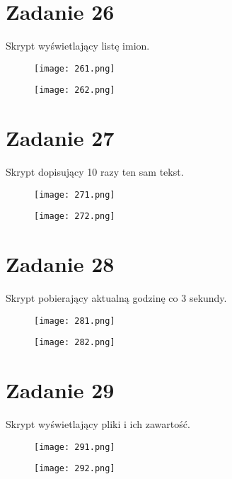 \documentclass[fleqn,onecolumn,a4paper,12pt,titlepage]{article}
\begin{document}
\section*{Zadanie 26}
Skrypt wyświetlający listę imion.
\begin{figure}[H]%
    \centering\texttt{[image: 261.png]}
\end{figure}
\begin{figure}[H]%
    \centering\texttt{[image: 262.png]}
\end{figure}

\section*{Zadanie 27}
Skrypt dopisujący 10 razy ten sam tekst.
\begin{figure}[H]%
    \centering\texttt{[image: 271.png]}
\end{figure}
\begin{figure}[H]%
    \centering\texttt{[image: 272.png]}
\end{figure}

\section*{Zadanie 28}
Skrypt pobierający aktualną godzinę co 3 sekundy.
\begin{figure}[H]%
    \centering\texttt{[image: 281.png]}
\end{figure}
\begin{figure}[H]%
    \centering\texttt{[image: 282.png]}
\end{figure}

\section*{Zadanie 29}
Skrypt wyświetlający pliki i ich zawartość.
\begin{figure}[H]%
    \centering\texttt{[image: 291.png]}
\end{figure}
\begin{figure}[H]%
    \centering\texttt{[image: 292.png]}
\end{figure}
\end{document}
